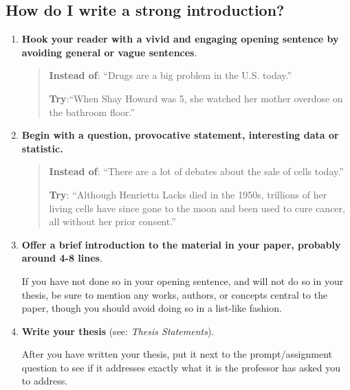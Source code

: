 \documentclass[12pt, hidelinks]{article} %
\begin{document}
\subsection{How do I write a strong introduction?}

\begin{enumerate}
\item \textbf{Hook your reader with a vivid and engaging opening sentence by avoiding general or vague sentences}.
        	               	        	
\begin{quote}

\textbf{Instead of}: ``Drugs are a big problem in the U.S. today.''

\textbf{Try}:``When Shay Howard was 5, she watched her mother
overdose on  the bathroom floor.''
\end{quote}
        	    	
\item {\textbf{Begin with a question, provocative statement, interesting data or statistic.}}

\begin{quote}
                            	                   
\textbf{Instead of}: ``There are a lot of debates about the sale of cells today.''

\textbf{Try}: ``Although Henrietta Lacks died in the 1950s, trillions
      of her living cells have since gone to the moon and  
      been used to cure cancer, all without her prior
      consent.''     
\end{quote}
                    	 
\item \textbf{Offer a brief introduction to the material in your paper, probably around 4-8 lines}. 

If you have not done so in your opening sentence, and will not do so in your thesis, be sure to mention any works, authors, or concepts central to the paper, though you should avoid doing so in a list-like fashion.
 
\item \textbf{Write your thesis} (see: \emph{Thesis Statements}).

After you have written your thesis, put it next to the prompt/assignment question to see if it addresses exactly what it is the professor has asked you to address.  
  
 \end{enumerate}
\end{document}

